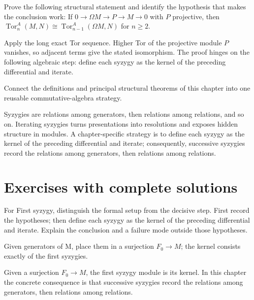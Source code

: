 \begin{problem}\label{prob:v24-problem-11}
Prove the following structural statement and identify the hypothesis that makes the conclusion work: If $0\to\Omega M\to P\to M\to0$ with $P$ projective, then $\operatorname{Tor}_{n}^A(M,N)\cong\operatorname{Tor}_{n-1}^A(\Omega M,N)$ for $n\ge2$.
\end{problem}
\begin{solution}
Apply the long exact Tor sequence. Higher Tor of the projective module $P$ vanishes, so adjacent terms give the stated isomorphism. The proof hinges on the following algebraic step: define each syzygy as the kernel of the preceding differential and iterate.
\end{solution}

\begin{problem}\label{prob:v24-problem-12}
Connect the definitions and principal structural theorems of this chapter into one reusable commutative-algebra strategy.
\end{problem}
\begin{solution}
Syzygies are relations among generators, then relations among relations, and so on. Iterating syzygies turns presentations into resolutions and exposes hidden structure in modules. A chapter-specific strategy is to define each syzygy as the kernel of the preceding differential and iterate; consequently, successive syzygies record the relations among generators, then relations among relations.
\end{solution}

\section{Exercises with complete solutions}

\begin{exercise}\label{exr:v24-01}
For First syzygy, distinguish the formal setup from the decisive step. First record the hypotheses; then define each syzygy as the kernel of the preceding differential and iterate. Explain the conclusion and a failure mode outside those hypotheses.
\end{exercise}
\begin{hint}
Given generators of M, place them in a surjection \(F_0\to M\); the kernel consists exactly of the first syzygies.
\end{hint}
\begin{solution}
Given a surjection $F_0\to M$, the first syzygy module is its kernel. In this chapter the concrete consequence is that successive syzygies record the relations among generators, then relations among relations.
\end{solution}

